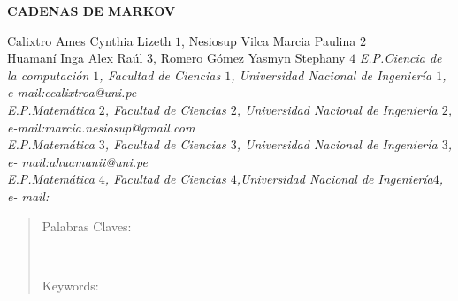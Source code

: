 \documentclass[10pt,a4paper]{article}
\theoremstyle{definition}
\theoremstyle{remark}
\begin{document}
\begin{center}
 {\Large \textbf{CADENAS DE MARKOV}}
\end{center}
\begin{center}
Calixtro Ames Cynthia Lizeth $1$, Nesiosup Vilca Marcia Paulina $2$\\
Huamaní Inga Alex Raúl $3$, Romero Gómez Yasmyn Stephany $4$\vskip12pt
{\it E.P.Ciencia de la computación $1$, Facultad de Ciencias $1$, Universidad Nacional de Ingeniería $1$, e-mail:ccalixtroa@uni.pe \\E.P.Matemática $2$, Facultad de Ciencias $2$, Universidad Nacional de Ingeniería $2$, e-mail:marcia.nesiosup@gmail.com \\ E.P.Matemática $3$, Facultad de Ciencias $3$, Universidad Nacional de Ingeniería $3$, e-
mail:ahuamanii@uni.pe \\E.P.Matemática $4$, Facultad de Ciencias $4$,Universidad Nacional de Ingeniería$4$, e- mail:}
\end{center}
\begin{quotation}
{\small
\begin{abstract}

\end{abstract}
Palabras Claves:   
}\\
{\small
\hspace*{0.5cm} 

Keywords:  \\ 
}
\end{quotation}
\end{document}
